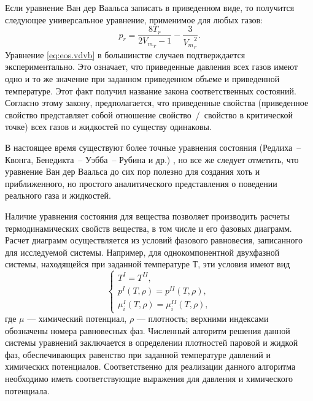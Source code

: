 Если уравнение Ван дер Ваальса записать в приведенном виде, то получится следующее универсальное уравнение, применимое для любых газов:
\begin{equation} \label{eq:eos.vdvb}
	p_r=\dfrac{8 T_r}{2 {V_m}_r-1}-\dfrac{3}{{V_m}_r^2}.
\end{equation}
Уравнение \eqref{eq:eos.vdvb} в большинстве случаев подтверждается экспериментально. Это означает, что приведенные давления всех газов имеют одно и то же значение при заданном приведенном объеме и приведенной температуре. Этот факт получил название закона соответственных состояний. Согласно этому закону, предполагается, что приведенные свойства (приведенное свойство представляет собой отношение свойство / свойство в критической точке) всех газов и жидкостей по существу одинаковы.

В настоящее время существуют более точные уравнения состояния (Редлиха~-- Квонга, Бенедикта~-- Уэбба~-- Рубина и др.) \cite{rid1982,yelles1989}, но все же следует отметить, что уравнение Ван дер Ваальса до сих пор полезно для создания хоть и приближенного, но простого аналитического представления о поведении реального газа и жидкостей.

Наличие уравнения состояния для вещества позволяет производить расчеты термодинамических свойств вещества, в том числе и его фазовых диаграмм. Расчет диаграмм осуществляется из условий фазового равновесия, записанного для исследуемой системы. Например, для однокомпонентной двухфазной системы, находящейся при заданной температуре $Т$, эти условия имеют вид
\begin{equation}\label{eq:oes.equi}
\left\lbrace 
\begin{gathered} 
T^{I}=T^{II},\\
p^{I}(T,\rho)=p^{II}(T,\rho),\\
\mu_i^{I}(T,\rho)=\mu^{II}_i(T,\rho),
\end{gathered} 
\right.
\end{equation}
где $\mu$ --- химический потенциал, $\rho$ --- плотность; верхними индексами обозначены номера равновесных фаз. Численный алгоритм решения данной системы уравнений заключается в определении плотностей паровой и жидкой фаз, обеспечивающих равенство при заданной температуре давлений и химических потенциалов. Соответственно для реализации данного алгоритма необходимо иметь соответствующие выражения для давления и химического потенциала.

